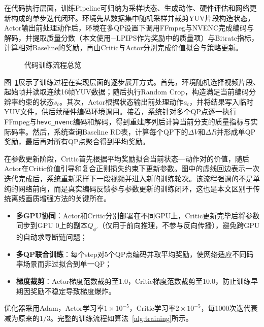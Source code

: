 在代码执行层面，训练Pipeline可归纳为采样状态、生成动作、硬件评估和网络更新构成的单步迭代闭环。环境先从数据集中随机采样并裁剪YUV片段构造状态，Actor输出前处理动作后，环境在多QP设置下调用FFmpeg与NVENC完成编码与解码，并提取质量分数（本文使用$-\mathrm{LPIPS}$作为奖励中的质量项）与Bitrate指标，计算相对Baseline的奖励，再由Critic与Actor分别完成价值拟合与策略更新。

\begin{figure}[!htbp]
  \centering
  \resizebox{0.94\textwidth}{!}{}
  \caption{代码训练流程总览}
  \label{fig:code-training-overview}
\end{figure}

图~\ref{fig:code-training-overview}展示了训练过程在实现层面的逐步展开方式。首先，环境随机选择视频片段、起始帧并读取连续16帧YUV数据；随后执行Random Crop，构造满足当前编码分辨率约束的状态$s_t$。其次，Actor根据状态输出前处理动作$a_t$，并将结果写入临时YUV文件，供后续硬件编码环境调用。接着，系统针对多个QP点逐一执行FFmpeg与\texttt{hevc\_nvenc}编码和解码，得到重建序列后计算当前分支的质量指标与实际码率。然后，系统查询Baseline RD表，计算每个QP下的$\Delta V$和$\Delta R$并形成单QP奖励，最后再对所有QP点聚合得到平均奖励。

在参数更新阶段，Critic首先根据平均奖励拟合当前状态—动作对的价值，随后Actor在Critic价值引导和复合正则损失约束下更新参数。图中的虚线回边表示一次迭代完成后，系统重新采样下一段视频并进入新的训练轮次。该流程强调的不是单纯的网络前向，而是真实编码反馈参与参数更新的训练闭环，这也是本文区别于传统离线画质增强方法的关键所在。

\begin{itemize}
  \item \textbf{多GPU协同}：Actor和Critic分别部署在不同GPU上，Critic更新完毕后将参数同步到GPU 0上的副本$Q_{\phi'}$（仅用于前向推理，不参与反向传播），避免跨GPU的自动求导断链问题；
  \item \textbf{多QP联合训练}：每个step对5个QP点编码并取平均奖励，使网络适应不同码率场景而非过拟合到单一QP；
  \item \textbf{梯度裁剪}：Actor梯度范数裁剪至1.0，Critic梯度范数裁剪至10.0，防止训练早期因奖励不稳定导致梯度爆炸。
\end{itemize}

优化器采用Adam\cite{Kingma2014AdamAM}，Actor学习率$1 \times 10^{-5}$，Critic学习率$2 \times 10^{-5}$，每1000次迭代衰减为原来的$1/3$。完整的训练流程如算法~\ref{alg:training}所示。


